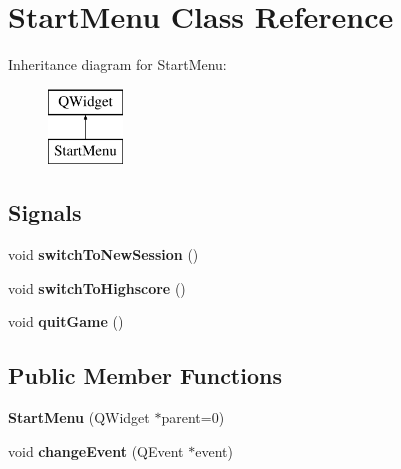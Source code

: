 \hypertarget{classStartMenu}{\section{Start\-Menu Class Reference}
\label{classStartMenu}
}
Inheritance diagram for Start\-Menu\-:\begin{figure}[H]
\begin{center}
\leavevmode
\includegraphics[height=2.000000cm]{classStartMenu}
\end{center}
\end{figure}
\subsection*{Signals}
\begin{DoxyCompactItemize}
\item 
\hypertarget{classStartMenu_a94d2da8144b5e99707ef5dc1ea588982}{void {\bfseries switch\-To\-New\-Session} ()}\label{classStartMenu_a94d2da8144b5e99707ef5dc1ea588982}

\item 
\hypertarget{classStartMenu_a95881192196673c85ad1dc12df5f9820}{void {\bfseries switch\-To\-Highscore} ()}\label{classStartMenu_a95881192196673c85ad1dc12df5f9820}

\item 
\hypertarget{classStartMenu_aff58f89652b89899b21d40f3188b516d}{void {\bfseries quit\-Game} ()}\label{classStartMenu_aff58f89652b89899b21d40f3188b516d}

\end{DoxyCompactItemize}
\subsection*{Public Member Functions}
\begin{DoxyCompactItemize}
\item 
\hypertarget{classStartMenu_a1491fb2672b951483f3cfc0594571fbb}{{\bfseries Start\-Menu} (Q\-Widget $\ast$parent=0)}\label{classStartMenu_a1491fb2672b951483f3cfc0594571fbb}

\item 
\hypertarget{classStartMenu_afc4a48db40567e80c6514b0af30d3797}{void {\bfseries change\-Event} (Q\-Event $\ast$event)}\label{classStartMenu_afc4a48db40567e80c6514b0af30d3797}

\end{DoxyCompactItemize}


